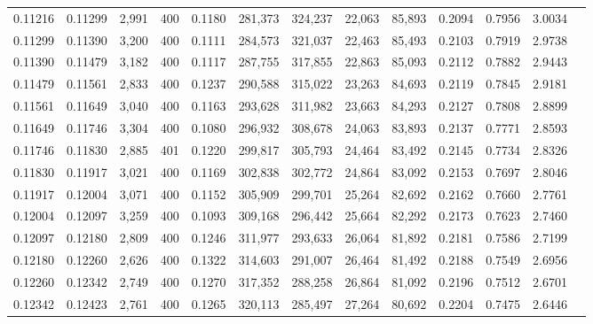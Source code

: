 \begin{tabular}{rrrrrrrrrrrrr}
0.11216 & 0.11299 &  2,991 & 400 &                                     0.1180 & 281,373 & 324,237 &  22,063 &  85,893 & 0.2094 & 0.7956 & 3.0034 \\
0.11299 & 0.11390 &  3,200 & 400 &                                     0.1111 & 284,573 & 321,037 &  22,463 &  85,493 & 0.2103 & 0.7919 & 2.9738 \\
0.11390 & 0.11479 &  3,182 & 400 &                                     0.1117 & 287,755 & 317,855 &  22,863 &  85,093 & 0.2112 & 0.7882 & 2.9443 \\
0.11479 & 0.11561 &  2,833 & 400 &                                     0.1237 & 290,588 & 315,022 &  23,263 &  84,693 & 0.2119 & 0.7845 & 2.9181 \\
0.11561 & 0.11649 &  3,040 & 400 &                                     0.1163 & 293,628 & 311,982 &  23,663 &  84,293 & 0.2127 & 0.7808 & 2.8899 \\
0.11649 & 0.11746 &  3,304 & 400 &                                     0.1080 & 296,932 & 308,678 &  24,063 &  83,893 & 0.2137 & 0.7771 & 2.8593 \\
0.11746 & 0.11830 &  2,885 & 401 &                                     0.1220 & 299,817 & 305,793 &  24,464 &  83,492 & 0.2145 & 0.7734 & 2.8326 \\
0.11830 & 0.11917 &  3,021 & 400 &                                     0.1169 & 302,838 & 302,772 &  24,864 &  83,092 & 0.2153 & 0.7697 & 2.8046 \\
0.11917 & 0.12004 &  3,071 & 400 &                                     0.1152 & 305,909 & 299,701 &  25,264 &  82,692 & 0.2162 & 0.7660 & 2.7761 \\
0.12004 & 0.12097 &  3,259 & 400 &                                     0.1093 & 309,168 & 296,442 &  25,664 &  82,292 & 0.2173 & 0.7623 & 2.7460 \\
0.12097 & 0.12180 &  2,809 & 400 &                                     0.1246 & 311,977 & 293,633 &  26,064 &  81,892 & 0.2181 & 0.7586 & 2.7199 \\
0.12180 & 0.12260 &  2,626 & 400 &                                     0.1322 & 314,603 & 291,007 &  26,464 &  81,492 & 0.2188 & 0.7549 & 2.6956 \\
0.12260 & 0.12342 &  2,749 & 400 &                                     0.1270 & 317,352 & 288,258 &  26,864 &  81,092 & 0.2196 & 0.7512 & 2.6701 \\
0.12342 & 0.12423 &  2,761 & 400 &                                     0.1265 & 320,113 & 285,497 &  27,264 &  80,692 & 0.2204 & 0.7475 & 2.6446 \\

\end{tabular}
